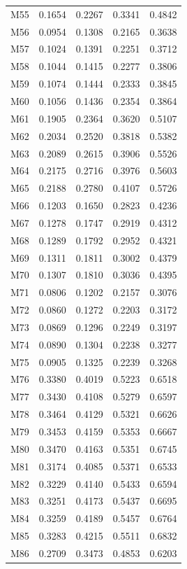 \begin{longtable}{lrrrr}
M55 & 0.1654 & 0.2267 & 0.3341 & 0.4842 \\
M56 & 0.0954 & 0.1308 & 0.2165 & 0.3638 \\
M57 & 0.1024 & 0.1391 & 0.2251 & 0.3712 \\
M58 & 0.1044 & 0.1415 & 0.2277 & 0.3806 \\
M59 & 0.1074 & 0.1444 & 0.2333 & 0.3845 \\
M60 & 0.1056 & 0.1436 & 0.2354 & 0.3864 \\
M61 & 0.1905 & 0.2364 & 0.3620 & 0.5107 \\
M62 & 0.2034 & 0.2520 & 0.3818 & 0.5382 \\
M63 & 0.2089 & 0.2615 & 0.3906 & 0.5526 \\
M64 & 0.2175 & 0.2716 & 0.3976 & 0.5603 \\
M65 & 0.2188 & 0.2780 & 0.4107 & 0.5726 \\
M66 & 0.1203 & 0.1650 & 0.2823 & 0.4236 \\
M67 & 0.1278 & 0.1747 & 0.2919 & 0.4312 \\
M68 & 0.1289 & 0.1792 & 0.2952 & 0.4321 \\
M69 & 0.1311 & 0.1811 & 0.3002 & 0.4379 \\
M70 & 0.1307 & 0.1810 & 0.3036 & 0.4395 \\
M71 & 0.0806 & 0.1202 & 0.2157 & 0.3076 \\
M72 & 0.0860 & 0.1272 & 0.2203 & 0.3172 \\
M73 & 0.0869 & 0.1296 & 0.2249 & 0.3197 \\
M74 & 0.0890 & 0.1304 & 0.2238 & 0.3277 \\
M75 & 0.0905 & 0.1325 & 0.2239 & 0.3268 \\
M76 & 0.3380 & 0.4019 & 0.5223 & 0.6518 \\
M77 & 0.3430 & 0.4108 & 0.5279 & 0.6597 \\
M78 & 0.3464 & 0.4129 & 0.5321 & 0.6626 \\
M79 & 0.3453 & 0.4159 & 0.5353 & 0.6667 \\
M80 & 0.3470 & 0.4163 & 0.5351 & 0.6745 \\
M81 & 0.3174 & 0.4085 & 0.5371 & 0.6533 \\
M82 & 0.3229 & 0.4140 & 0.5433 & 0.6594 \\
M83 & 0.3251 & 0.4173 & 0.5437 & 0.6695 \\
M84 & 0.3259 & 0.4189 & 0.5457 & 0.6764 \\
M85 & 0.3283 & 0.4215 & 0.5511 & 0.6832 \\
M86 & 0.2709 & 0.3473 & 0.4853 & 0.6203 \\

\end{longtable}

